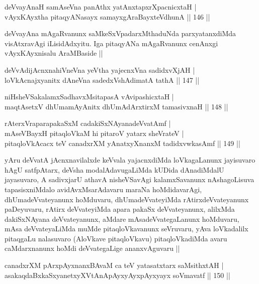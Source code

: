 \begin{shl}
deVvayAnaH samAseVna panAthx yatAnxtapxrXpacnicxtaH | \\
vAyxKAyx\s tha pitaqyANasayx samayxgAraBayxteV\s dhunA \hfill|| 146 || 
\end{shl}

\begin{artha}
deVvayAna mAgaRvanunx saMkeSxVpadarxMthaduNda parxyatanxdiMda
visAtxravAgi iLisidAdxyitu. Iga pitaqyANa mAgaRvanunx cenAnxgi
vAyxKAyxnisalu AraMBaside ||
\end{artha}

\begin{shl}
deVvAdijAcnxnahiVneVna yeV\s tha yajecnxVna sadidxvXjAH | \\
loVkAcnajxyanitx dAneVna sadedxVshAdimatA tathA \hfill|| 147 || 
\end{shl}

\begin{shl}
niHsheVSakalamxSadhavxMsitapasA vA\s vipashicxtaH | \\
maqtAsetxV dhUmamAyAnitx dhUmAdArxtirxM tamasivxnaH \hfill|| 148 || 
\end{shl}

\begin{shl}
rAterxVraparapakaSxM cadakiSxNAyanadeVvatAmf | \\
mAseVBayxH pitaqloVkaM hi pitaroV yatarx sheVrateV | \\
pitaqloVkAcacx teV canadxrXM yAnatxyXnanxM tadidxvwkasAmf \hfill|| 149 || 
\end{shl}

\begin{artha}
yAru deVvatA jAcnxnavilalxde keVvala yajacnxdiMda loVkagaLanunx
jayisuvaro hAgU satfpAtarx, deVsha modalAdavugaLiMda kUDida
dAnadiMdalU jayasuvaro, A sadivxjarU athavA nisheVSavAgi
kalamxSavanunx nAshagoLisuva tapasisxniMdalo avidAvxMsarAdavaru maraNa
hoMdidavarAgi, dhUmadeVvateyanunx hoMduvaru, dhUmadeVvateyiMda
rAtirxdeVvateyanunx paDeyuvaru, rAtirx deVvateyiMda apara pakaSx
deVvateyanunx, alilxMda dakiSxNAyana deVvateyanunx, aMdare
mAsadeVvategaLanunx hoMduvaru, mAsa deVvateyaLiMda muMde
pitaqloVkavanunx seVruvaru, yAva loVkadalilx pitaqgaLu nalasuvaro
(AloVkave pitaqloVkavu) pitaqloVkadiMda avaru caMdarxnanunx hoMdi
deVvategaLige ananxvAguvaru ||
\end{artha}


\begin{shl}
canadxrXM pArxpAyxnanxBAvaM ca teV yatasatxtarx saMsithxtAH | \\
asakaqdaBxkaSxyanetxyXVtAnApAyxyAyx\s \s pAyxyayx soVmavatf \hfill|| 150 || 
\end{shl}

